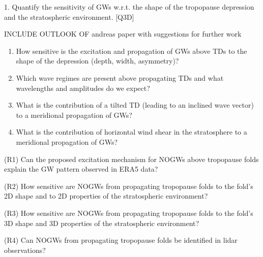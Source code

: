 1. Quantify the sensitivity of GWs w.r.t. the shape of the tropopause depression and the stratospheric environment. [Q3D] 


INCLUDE OUTLOOK OF andreas paper with suggestions for further work

\begin{enumerate}
    \item How sensitive is the excitation and propagation of GWs above TDs to the shape of the depression (depth, width, asymmetry)?
    \item Which wave regimes are present above propagating TDs and what wavelengths and amplitudes do we expect?
    \item What is the contribution of a tilted TD (leading to an inclined wave vector) to a meridional propagation of GWs?
    \item What is the contribution of horizontal wind shear in the stratosphere to a meridional propagation of GWs?
\end{enumerate}


\begin{tcolorbox}[]
    (R1) Can the proposed excitation mechanism for NOGWs above tropopause folds explain the GW pattern observed in ERA5 data?
\end{tcolorbox}

\begin{tcolorbox}[]
    (R2) How sensitive are NOGWs from propagating tropopause folds to the fold's 2D shape and to 2D properties of the stratospheric environment?
\end{tcolorbox}

\begin{tcolorbox}[]
    (R3) How sensitive are NOGWs from propagating tropopause folds to the fold's 3D shape and 3D properties of the stratospheric environment?
\end{tcolorbox}

\begin{tcolorbox}[]
    (R4) Can NOGWs from propagating tropopause folds be identified in lidar observations?
\end{tcolorbox}




